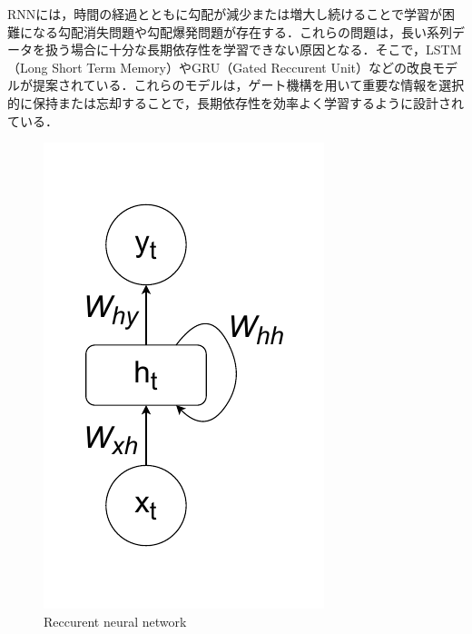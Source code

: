 RNNには，時間の経過とともに勾配が減少または増大し続けることで学習が困難になる勾配消失問題\cite{hochreiter2001gradient-grad,weinleindiplomarbeit-grad,schmidhuber2015deep-grad}や勾配爆発問題が存在する．これらの問題は，長い系列データを扱う場合に十分な長期依存性を学習できない原因となる．そこで，LSTM（Long Short Term Memory）\cite{hochreiter1997long}やGRU（Gated Reccurent Unit）\cite{chung2014empirical-gru}などの改良モデルが提案されている．これらのモデルは，ゲート機構を用いて重要な情報を選択的に保持または忘却することで，長期依存性を効率よく学習するように設計されている．
\begin{figure}[hbtp]
  \centering
 \includegraphics[keepaspectratio, scale=0.52]
      {images/neural-network-rnn.pdf}
 \caption{Reccurent neural network}
 \label{Fig:rnn}
\end{figure}   

\newpage
